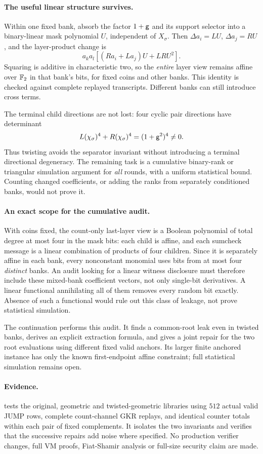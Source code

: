 \documentclass[11pt]{article}
\begin{document}
\paragraph{The useful linear structure survives.} Within one fixed bank, absorb the factor $1+\mathsf{g}$ and its support selector into a binary-linear mask polynomial $U$, independent of $X_\sigma$. Then $\Delta a_i=LU$, $\Delta a_j=RU$, and the layer-product change is
\[
 a_k a_l\left[(Ra_i+La_j)U+LRU^2\right].
\]
Squaring is additive in characteristic two, so the \emph{entire} layer view remains affine over $\mathbb{F}_2$ in that bank's bits, for fixed coins and other banks. This identity is checked against complete replayed transcripts. Different banks can still introduce cross terms.

The terminal child directions are not lost: four cyclic pair directions have determinant
\[
 L(\chi_\sigma)^4+R(\chi_\sigma)^4=(1+\mathsf{g}^2)^4\ne0.
\]
Thus twisting avoids the separator invariant without introducing a terminal directional degeneracy. The remaining task is a cumulative binary-rank or triangular simulation argument for \emph{all} rounds, with a uniform statistical bound. Counting changed coefficients, or adding the ranks from separately conditioned banks, would not prove it.

\paragraph{An exact scope for the cumulative audit.} With coins fixed, the count-only last-layer view is a Boolean polynomial of total degree at most four in the mask bits: each child is affine, and each sumcheck message is a linear combination of products of four children. Since it is separately affine in each bank, every nonconstant monomial uses bits from at most four \emph{distinct} banks. An audit looking for a linear witness disclosure must therefore include these mixed-bank coefficient vectors, not only single-bit derivatives. A linear functional annihilating all of them removes every random bit exactly. Absence of such a functional would rule out this class of leakage, not prove statistical simulation.

The continuation  performs this audit. It finds a common-root leak even in twisted banks, derives an explicit extraction formula, and gives a joint repair for the two root evaluations using different fixed valid anchors. Its larger finite anchored instance has only the known first-endpoint affine constraint; full statistical simulation remains open.

\paragraph{Evidence.}  tests the original, geometric and twisted-geometric libraries using $512$ actual valid JUMP rows, complete count-channel GKR replays, and identical counter totals within each pair of fixed complements. It isolates the two invariants and verifies that the successive repairs add noise where specified. No production verifier changes, full VM proofs, Fiat-Shamir analysis or full-size security claim are made.
\end{document}
